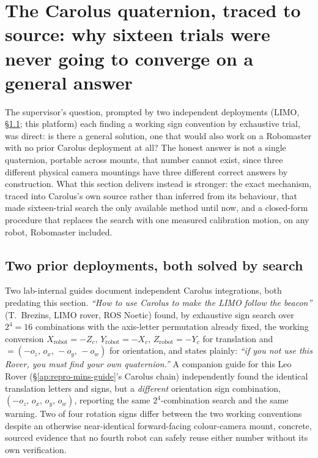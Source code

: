 \section{The Carolus quaternion, traced to source: why sixteen trials were
never going to converge on a general answer}
\label{sec:quaternion}
The supervisor's question, prompted by two independent deployments (LIMO,
\S\ref{sec:limodoc}; this platform) each finding a working sign convention by
exhaustive trial, was direct: is there a general solution, one that would also
work on a Robomaster with no prior Carolus deployment at all? The honest
answer is not a single quaternion, portable across mounts, that number cannot
exist, since three different physical camera mountings have three different
correct answers by construction. What this section delivers instead is
stronger: the exact mechanism, traced into Carolus's own source rather than
inferred from its behaviour, that made sixteen-trial search the only available
method until now, and a closed-form procedure that replaces the search with
one measured calibration motion, on any robot, Robomaster included.

\subsection{Two prior deployments, both solved by search}
\label{sec:limodoc}
Two lab-internal guides document independent Carolus integrations, both
predating this section. \emph{``How to use Carolus to make the LIMO follow
the beacon''} (T.~Brezins, LIMO rover, ROS Noetic) found, by exhaustive
sign search over $2^4=16$ combinations with the axis-letter permutation
already fixed, the working conversion
$X_{\text{robot}}=-Z_c,\,Y_{\text{robot}}=-X_c,\,Z_{\text{robot}}=-Y_c$ for
translation and 
$=(-o_z,\,o_x,\,-o_y,\,-o_w)$ for orientation, and states plainly: \emph{``if
you not use this Rover, you must find your own quaternion.''} A companion
guide for this Leo Rover (\S\ref{ap:repro-mins-guide}'s Carolus chain)
independently found the identical translation letters and signs, but a
\emph{different} orientation sign combination,
$(-o_z,\,o_x,\,o_y,\,o_w)$, reporting the same $2^4$-combination search and
the same warning. Two of four rotation signs differ between the two working
conventions despite an otherwise near-identical forward-facing colour-camera
mount, concrete, sourced evidence that no fourth robot can safely reuse
either number without its own verification.

